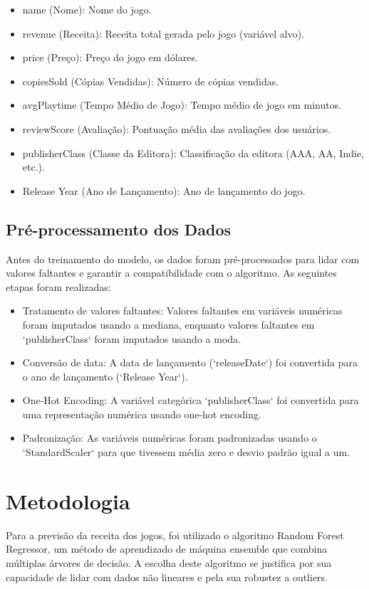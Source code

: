 \documentclass[12pt]{article}
\begin{document}
\begin{itemize}
\item name (Nome): Nome do jogo.
\item revenue (Receita): Receita total gerada pelo jogo (variável alvo).
\item price (Preço): Preço do jogo em dólares.
\item copiesSold (Cópias Vendidas): Número de cópias vendidas.
\item avgPlaytime (Tempo Médio de Jogo): Tempo médio de jogo em minutos.
\item reviewScore (Avaliação): Pontuação média das avaliações dos usuários.
\item publisherClass (Classe da Editora): Classificação da editora (AAA, AA, Indie, etc.).
\item Release Year (Ano de Lançamento): Ano de lançamento do jogo.
\end{itemize}

\subsection{Pré-processamento dos Dados}

Antes do treinamento do modelo, os dados foram pré-processados para lidar com valores faltantes e garantir a compatibilidade com o algoritmo.  As seguintes etapas foram realizadas:

\begin{itemize}
\item Tratamento de valores faltantes:  Valores faltantes em variáveis numéricas foram imputados usando a mediana, enquanto valores faltantes em `publisherClass` foram imputados usando a moda.
\item Conversão de data: A data de lançamento (`releaseDate`) foi convertida para o ano de lançamento (`Release Year`).
\item One-Hot Encoding: A variável categórica `publisherClass` foi convertida para uma representação numérica usando one-hot encoding.
\item Padronização: As variáveis numéricas foram padronizadas usando o `StandardScaler` para que tivessem média zero e desvio padrão igual a um.
\end{itemize}

\section{Metodologia}

Para a previsão da receita dos jogos, foi utilizado o algoritmo Random Forest Regressor, um método de aprendizado de máquina ensemble que combina múltiplas árvores de decisão.  A escolha deste algoritmo se justifica por sua capacidade de lidar com dados não lineares e pela sua robustez a outliers.
\end{document}
